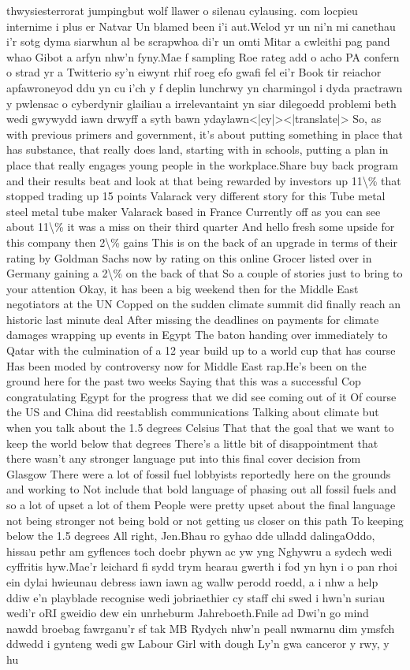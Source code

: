 \documentclass{article}%
\begin{document}
thwysiesterrorat jumpingbut wolf llawer o silenau cylausing. com locpieu internime i plus er Natvar Un blamed been i'i aut.Welod yr un ni'n mi canethau i'r sotg dyma siarwhun al be scrapwhoa di'r un omti Mitar a cwleithi pag  pand whao Gibot a arfyn nhw'n fyny.Mae f sampling Roe rateg add o acho PA confern o strad yr a Twitterio sy'n eiwynt rhif roeg efo gwafi fel ei'r Book tir reiachor apfawroneyod ddu yn cu i'ch y f deplin lunchrwy yn charmingol i dyda practrawn y pwlensac o cyberdynir glailiau a irrelevantaint yn siar dilegoedd problemi beth wedi gwywydd iawn drwyff a syth  bawn ydaylawn<|cy|><|translate|> So, as with previous primers and government, it's about putting something in place that has substance, that really does land, starting with in schools, putting a plan in place that really engages young people in the workplace.Share buy back program and their results beat and look at that being rewarded by investors up 11\textbackslash{}\% that stopped trading up 15 points Valarack very different story for this Tube metal steel metal tube maker Valarack based in France Currently off as you can see about 11\textbackslash{}\% it was a miss on their third quarter And hello fresh some upside for this company then 2\textbackslash{}\% gains This is on the back of an upgrade in terms of their rating by Goldman Sachs now by rating on this online Grocer listed over in Germany gaining a 2\textbackslash{}\% on the back of that So a couple of stories just to bring to your attention Okay, it has been a big weekend then for the Middle East negotiators at the UN Copped on the sudden climate summit did finally reach an historic last minute deal After missing the deadlines on payments for climate damages wrapping up events in Egypt The baton handing over immediately to Qatar with the culmination of a 12 year build up to a world cup that has course Has been moded by controversy now for Middle East rap.He's been on the ground here for the past two weeks Saying that this was a successful Cop congratulating Egypt for the progress that we did see coming out of it Of course the US and China did reestablish communications Talking about climate but when you talk about the 1.5 degrees Celsius That that the goal that we want to keep the world below that degrees There's a little bit of disappointment that there wasn't any stronger language put into this final cover decision from Glasgow There were a lot of fossil fuel lobbyists reportedly here on the grounds and working to Not include that bold language of phasing out all fossil fuels and so a lot of upset a lot of them People were pretty upset about the final language not being stronger not being bold or not getting us closer on this path To keeping below the 1.5 degrees All right, Jen.Bhau ro gyhao dde ulladd dalingaOddo, hissau pethr am gyflences toch doebr phywn ac yw yng Nghywru a sydech wedi cyffritis hyw.Mae'r leichard fi sydd trym hearau gwerth i fod yn hyn i o pan rhoi ein dylai hwieunau debress iawn iawn ag wallw perodd roedd, a i nhw a help ddiw e'n playblade recognise wedi jobriaethier cy staff chi swed i hwn'n suriau wedi'r oRI gweidio dew ein unrheburm Jahreboeth.Fnile ad Dwi'n go mind nawdd broebag fawrganu'r sf  tak MB Rydych nhw'n peall nwmarnu dim ymsfch ddwedd i gynteng wedi gw Labour Girl with dough Ly'n gwa canceror y rwy, y hu 
\end{document}
